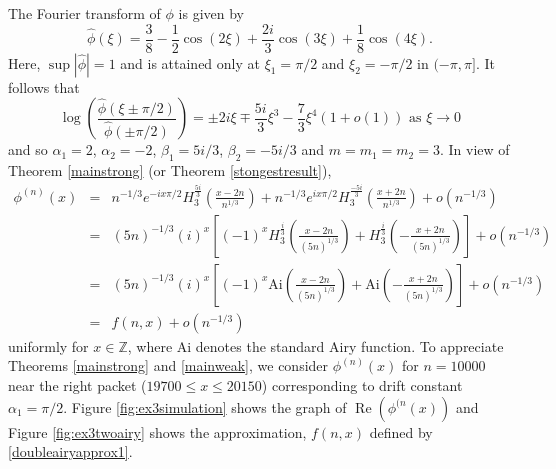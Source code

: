 \documentclass{article}
\theoremstyle{theorem}
\theoremstyle{remark}
\renewcommand\Re{\operatorname{Re}}%
\begin{document}
\noindent The Fourier transform of $\phi$ is given by
\begin{equation*}
\hat{\phi}(\xi)=\frac{3}{8}-\frac{1}{2}\cos(2\xi)+\frac{2i}{3}\cos(3\xi)+\frac{1}{8}\cos(4\xi).
\end{equation*}
Here, $\sup|\hat{\phi}|=1$ and is attained only at $\xi_1=\pi/2$ and $\xi_2=-\pi/2$ in $(-\pi,\pi]$. It follows that
\begin{equation*}
\log\left(\frac{\hat{\phi}(\xi\pm\pi/2)}{\hat{\phi}(\pm\pi/2)}\right)=\pm2i\xi\mp\frac{5i}{3}\xi^3-\frac{7}{3}\xi^4(1+o(1)) \mbox{ as }\xi\rightarrow 0
\end{equation*}
and so $\alpha_1=2$, $\alpha_2=-2$, $\beta_1=5i/3$, $\beta_2=-5i/3$ and $m=m_1=m_2=3$. In view of Theorem \ref{mainstrong} (or Theorem \ref{stongestresult}),
\begin{eqnarray}\label{doubleairyapprox1}\nonumber
\phi^{(n)}(x)&=& n^{-1/3}e^{-ix\pi/2}H^{\frac{5i}{3}}_3\left(\frac{x-2n}{n^{1/3}}\right)+n^{-1/3}e^{ix\pi/2}H^{\frac{-5i}{3}}_3\left(\frac{x+2n}{n^{1/3}}\right)+o(n^{-1/3})\\\nonumber
&=&(5n)^{-1/3}(i)^x\left[(-1)^xH_3^{\frac{i}{3}}\left(\frac{x-2n}{(5n)^{1/3}}\right)+H_3^{\frac{i}{3}}\left(-\frac{x+2n}{(5n)^{1/3}}\right)\right]+o(n^{-1/3})\\\nonumber
&=&(5n)^{-1/3}(i)^x\left[(-1)^x\mbox{Ai}\left(\frac{x-2n}{(5n)^{1/3}}\right)+\mbox{Ai}\left(-\frac{x+2n}{(5n)^{1/3}}\right)\right]+o(n^{-1/3})\\
&=&f(n,x)+o(n^{-1/3})
\end{eqnarray}
uniformly for $x\in\mathbb{Z}$, where $\mbox{Ai}$ denotes the standard Airy function. To appreciate Theorems \ref{mainstrong} and \ref{mainweak}, we consider $\phi^{(n)}(x)$ for $n=10000$ near the right packet ($19700\leq x\leq 20150$) corresponding to drift constant $\alpha_1=\pi/2$. Figure \ref{fig:ex3simulation} shows the graph of $\Re(\phi^{(n}(x))$ and Figure \ref{fig:ex3twoairy} shows the approximation, $f(n,x)$ defined by \eqref{doubleairyapprox1}.
\end{document}
